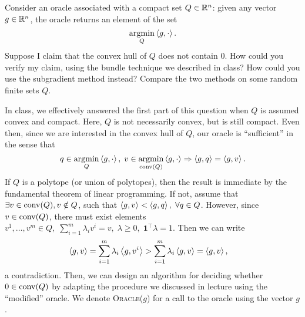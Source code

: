 \documentclass[10pt]{article}
\begin{document}
\begin{Exercise}
    Consider an oracle associated with a compact set $Q \in \mathbb{R}^n$: given any
    vector $g \in \mathbb{R}^n$, the oracle returns an element of the set
    \[
        \operatorname*{argmin}_{Q} \left\langle g, \cdot \right\rangle.
    \]
    Suppose I claim that the convex hull of $Q$ does not contain $0$. How could
    you verify my claim, using the bundle technique we described in class? How
    could you use the subgradient method instead? Compare the two methods on
    some random finite sets $Q$.
\end{Exercise}
\begin{Answer}
	In class, we effectively answered the first part of this question when $Q$
	is assumed convex and compact. Here, $Q$ is not necessarily convex, but is
	still compact. Even then, since we are interested in the convex hull
	of $Q$, our oracle is ``sufficient'' in the sense that
	\[
		q \in \operatorname*{argmin}_{Q} \left\langle g, \cdot \right\rangle, \; v \in \operatorname*{argmin}_{\mathrm{conv}(Q)} \left\langle g,
		\cdot \right\rangle \Rightarrow \left\langle g, q \right\rangle = \left\langle g, v \right\rangle.
	\]
	If $Q$ is a polytope (or union of polytopes), then the result is immediate
	by the fundamental theorem of linear programming. If not, assume that
	$\exists v \in \mathrm{conv}(Q), v \notin Q$, such that $\left\langle g, v \right\rangle < \left\langle g,
	q \right\rangle, \; \forall q \in Q$.
	However, since $v \in \mathrm{conv}(Q)$, there must exist elements
	$v^1, \dots, v^m \in Q, \; \sum_{i=1}^m \lambda_i v^i = v, \; \lambda \geq
	0, \; \bm{1}^\top \lambda = 1$. Then we can write
	\begin{align*}
		\left\langle g, v \right\rangle &= \sum_{i=1}^{m} \lambda_i \left\langle g, v^i \right\rangle
		> \sum_{i=1}^m \lambda_i \left\langle g, v \right\rangle = \left\langle g, v \right\rangle,
	\end{align*}
	a contradiction. Then, we can design an algorithm for deciding whether $0
	\in \mathrm{conv}(Q)$ by adapting the procedure we discussed in lecture using
	the ``modified'' oracle. We denote \textsc{Oracle}($g$) for a call to the
	oracle using the vector $g$.


\end{Answer}
\end{document}
